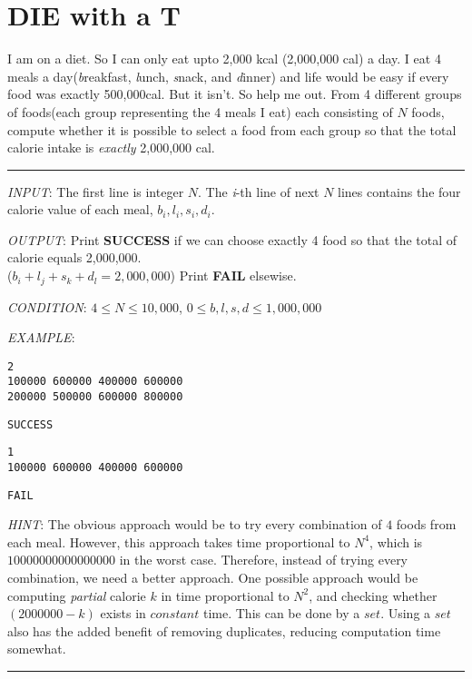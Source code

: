 \documentclass{article}
\begin{document}
\thispagestyle{fancy}
\setcounter{section}{-1}

\section{DIE with a T}
I am on a diet. So I can only eat upto 2,000 kcal (2,000,000 cal) a day.
I eat 4 meals a day(\textit{b}reakfast, \textit{l}unch, \textit{s}nack, and
\textit{d}inner) and life would be easy if
every food was exactly 500,000cal. But it isn't. So help me out.
From 4 different groups of foods(each group representing the 4 meals I eat) each consisting of $N$ foods, compute whether it is possible to select a food from each group
so that the total calorie intake is \textit{exactly} 2,000,000 cal.\\
\noindent\rule{\textwidth}{0.9pt}
\textit{INPUT}: The first line is integer $N$.
The \textit{i}-th line of next $N$ lines contains the four calorie value of each
meal, $b_{i}, l_{i}, s_{i}, d_{i}$.

\textit{OUTPUT}: Print \textbf{SUCCESS} if we can choose exactly 4 food so that
the total of calorie equals 2,000,000.\\($b_{i}+l_{j}+s_{k}+d_{l} = 2,000,000$)
Print \textbf{FAIL} elsewise.

\textit{CONDITION}: $ 4 \le N \le 10,000$, $ 0 \le b,l,s,d \le 1,000,000$

\textit{EXAMPLE}:
\begin{lstlisting}
2
100000 600000 400000 600000
200000 500000 600000 800000
\end{lstlisting}
\begin{lstlisting}
SUCCESS
\end{lstlisting}
\begin{lstlisting}
1
100000 600000 400000 600000
\end{lstlisting}
\begin{lstlisting}
FAIL
\end{lstlisting}

\textit{HINT}: The obvious approach would be to try every combination
of $4$ foods from each meal. However, this approach takes time proportional to $N^4$,
which is $10000000000000000$ in the worst case.
Therefore, instead of trying every combination, we need a better approach.
One possible approach would be computing \textit{partial} calorie $k$ in time
proportional to $N^2$, and checking whether $(2000000-k)$ exists in $constant$ time. This can be done by a $set$. Using a $set$ also has the added benefit of
removing duplicates, reducing computation time somewhat.\\
\noindent\rule{\textwidth}{0.9pt}
\end{document}
